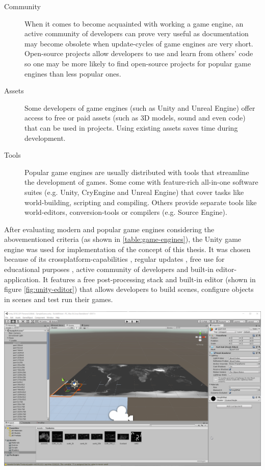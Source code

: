 \begin{description}
\item [Community] When it comes to become acquainted with working a game engine, an active community of developers can prove very useful as documentation may become obsolete when update-cycles of game engines are very short. Open-source projects allow developers to use and learn from others' code so one may be more likely to find open-source projects for popular game engines than less popular ones.
\item [Assets] Some developers of game engines (such as Unity and Unreal Engine) offer access to free or paid assets (such as 3D models, sound and even code) that can be used in projects. Using existing assets saves time during development.
\item [Tools] Popular game engines are usually distributed with tools that streamline the development of games. Some come with feature-rich all-in-one software suites (e.g. Unity, CryEngine and Unreal Engine) that cover tasks like world-building, scripting and compiling. Others provide separate tools like world-editors, conversion-tools or compilers (e.g. Source Engine).
\end{description}

After evaluating modern and popular game engines considering the abovementioned criteria (as shown in \ref{table:game-engines}), the Unity game engine was used for implementation of the concept of this thesis. It was chosen because of its crossplatform-capabilities \cite{UnityPlatformSupport}, regular updates \cite{UnityDownloadArchive}, free use for educational purposes \cite{UnityForEducation}, active community of developers \cite{UnityForum} and built-in editor-application. It features a free post-processing stack \cite{UnityPostProcessingStack} and built-in editor (shown in figure \ref{fig:unity-editor}) that allows developers to build scenes, configure objects in scenes and test run their games.
\begin{center}
\noindent\includegraphics[width=14cm]{tex/img/ch05/UnityScreenshot.png}
\label{fig:unity-editor}
\end{center}

